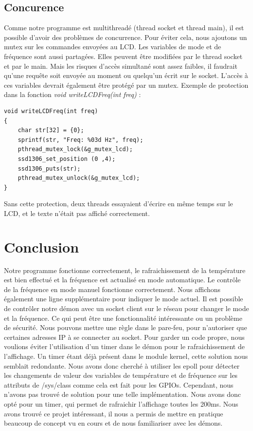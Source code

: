 \documentclass[
	a4paper, %
	10pt, %
]{CSUniSchoolLabReport}
\begin{document}
\newpage
\subsection{Concurence}
Comme notre programme est multithreadé (thread socket et thread main), il est possible d'avoir des problèmes de concurrence. Pour éviter cela, nous ajoutons un mutex sur les commandes envoyées au LCD.
Les variables de mode et de fréquence sont aussi partagées. Elles peuvent être modifiées par le thread socket et par le main. Mais les risques d'accès simultané sont assez faibles, il faudrait qu'une requête soit envoyée au moment ou quelqu'un écrit sur le socket. L'accès à ces variables devrait également être protégé par un mutex.
Exemple de protection dans la fonction \textit{void writeLCDFreq(int freq)} : \\
\begin{lstlisting}[style=CStyle]
void writeLCDFreq(int freq)
{
    char str[32] = {0};
    sprintf(str, "Freq: %03d Hz", freq);
    pthread_mutex_lock(&g_mutex_lcd);
    ssd1306_set_position (0 ,4);
    ssd1306_puts(str);
    pthread_mutex_unlock(&g_mutex_lcd);
}
\end{lstlisting}
Sans cette protection, deux threads essayaient d'écrire en même temps sur le LCD, et le texte n'était pas affiché correctement.

\section{Conclusion}
Notre programme fonctionne correctement, le rafraichissement de la température est bien effectué et la fréquence est actualisé en mode automatique.
Le contrôle de la fréquence en mode manuel fonctionne correctement. Nous affichons également une ligne supplémentaire pour indiquer le mode actuel.
Il est possible de contrôler notre démon avec un socket client sur le réseau pour changer le mode et la fréquence. Ce qui peut être une fonctionnalité intéressante ou un problème de sécurité. Nous pouvons mettre une règle dans le pare-feu, pour n'autoriser que certaines adresses IP à se connecter au socket.
\linebreak
\linebreak
Pour garder un code propre, nous voulions éviter l'utilisation d'un timer dans le démon pour le rafraichissement de l'affichage. Un timer étant déjà présent dans le module kernel, cette solution nous semblait redondante. Nous avons donc cherché à utiliser les epoll pour détecter les changements de valeur des variables de température et de fréquence sur les attributs de /sys/class comme cela est fait pour les GPIOs. Cependant, nous n'avons pas trouvé de solution pour une telle implémentation. Nous avons donc opté pour un timer, qui permet de rafraichir l'affichage toutes les 200ms.
Nous avons trouvé ce projet intéressant, il nous a permis de mettre en pratique beaucoup de concept vu en cours et de nous familiariser avec les démons.
\end{document}
